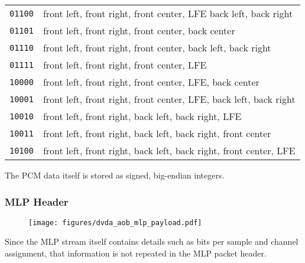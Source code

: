 \begin{table}[h]
{{\begin{tabular}{|c|l|}
\texttt{01100} & front left, front right, front center, LFE back left, back right \\
\texttt{01101} & front left, front right, front center, back center \\
\texttt{01110} & front left, front right, front center, back left, back right \\
\texttt{01111} & front left, front right, front center, LFE \\
\texttt{10000} & front left, front right, front center, LFE, back center \\
\texttt{10001} & front left, front right, front center, LFE, back left, back right \\
\texttt{10010} & front left, front right, back left, back right, LFE \\
\texttt{10011} & front left, front right, back left, back right, front center \\
\texttt{10100} & front left, front right, back left, back right, front center, LFE \\
\hline
\end{tabular}
}
}
\end{table}
\par
\noindent
The PCM data itself is stored as signed, big-endian integers.

\clearpage

\subsubsection{MLP Header}

\begin{figure}[h]
\texttt{[image: figures/dvda\_aob\_mlp\_payload.pdf]}
\end{figure}
\par
\noindent
Since the MLP stream itself contains details such as bits per sample
and channel assignment, that information is not repeated in the MLP
packet header.

\clearpage


